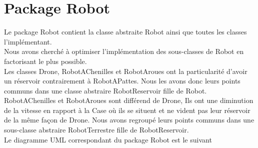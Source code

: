 \documentclass[
  oneside,
  11pt, a4paper,
  footinclude=true,
  headinclude=true,
  cleardoublepage=empty
]{scrbook}
\begin{document}
\section{Package Robot}
Le package Robot contient la classe abstraite Robot ainsi que toutes les classes l'implémentant. \\ 

Nous avons cherché à optimiser l'implémentation des sous-classes de Robot en factorisant le plus possible. \\ 

Les classes Drone, RobotAChenilles et RobotAroues ont la particularité d'avoir un réservoir contrairement à RobotAPattes. Nous les avons donc leurs points communs dans une classe abstraire RobotReservoir fille de Robot. \\

RobotAChenilles et RobotAroues sont différend de Drone, Ils ont une diminution de la vitesse en rapport à la Case où ils se situent et ne vident pas leur réservoir de la même façon de Drone. Nous avons regroupé leurs points communs dans une sous-classe abstraire RobotTerrestre fille de RobotReservoir. \\

Le diagramme UML correspondant du package Robot est le suivant \\
\end{document}
